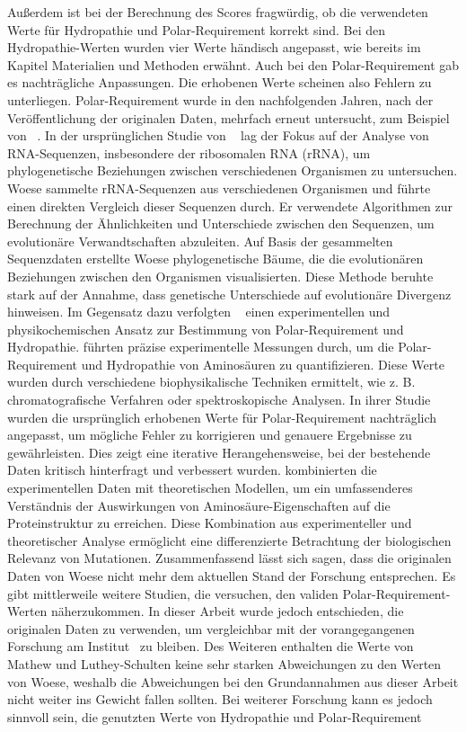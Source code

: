 \documentclass[german,version-2022-01]{uzl-thesis}
\begin{document}
Au\ss{}erdem ist bei der Berechnung des Scores fragw\"urdig, ob die verwendeten Werte f\"ur Hydropathie und Polar-Requirement korrekt sind. Bei den Hydropathie-Werten wurden vier Werte h\"andisch angepasst, wie bereits im Kapitel Materialien und Methoden erw\"ahnt. Auch bei den Polar-Requirement gab es nachtr\"agliche Anpassungen. Die erhobenen Werte scheinen also Fehlern zu unterliegen. Polar-Requirement wurde in den nachfolgenden Jahren, nach der Ver\"offentlichung der originalen Daten, mehrfach erneut untersucht, zum Beispiel von \citeauthor{mathew_physical_2008}~\cite{mathew_physical_2008}. In der urspr\"unglichen Studie von \citeauthor{woese_fundamental_1966}~\cite{woese_fundamental_1966} lag der Fokus auf der Analyse von RNA-Sequenzen, insbesondere der ribosomalen RNA (rRNA), um phylogenetische Beziehungen zwischen verschiedenen Organismen zu untersuchen. Woese sammelte rRNA-Sequenzen aus verschiedenen Organismen und f\"uhrte einen direkten Vergleich dieser Sequenzen durch. Er verwendete Algorithmen zur Berechnung der \"Ahnlichkeiten und Unterschiede zwischen den Sequenzen, um evolution\"are Verwandtschaften abzuleiten. Auf Basis der gesammelten Sequenzdaten erstellte Woese phylogenetische B\"aume, die die evolution\"aren Beziehungen zwischen den Organismen visualisierten. Diese Methode beruhte stark auf der Annahme, dass genetische Unterschiede auf evolution\"are Divergenz hinweisen. Im Gegensatz dazu verfolgten \citeauthor{mathew_physical_2008}~\cite{mathew_physical_2008} einen experimentellen und physikochemischen Ansatz zur Bestimmung von Polar-Requirement und Hydropathie. \citeauthor{mathew_physical_2008} f\"uhrten pr\"azise experimentelle Messungen durch, um die Polar-Requirement und Hydropathie von Aminos\"auren zu quantifizieren. Diese Werte wurden durch verschiedene biophysikalische Techniken ermittelt, wie z. B. chromatografische Verfahren oder spektroskopische Analysen. In ihrer Studie wurden die urspr\"unglich erhobenen Werte f\"ur Polar-Requirement nachtr\"aglich angepasst, um m\"ogliche Fehler zu korrigieren und genauere Ergebnisse zu gew\"ahrleisten. Dies zeigt eine iterative Herangehensweise, bei der bestehende Daten kritisch hinterfragt und verbessert wurden. \citeauthor{mathew_physical_2008} kombinierten die experimentellen Daten mit theoretischen Modellen, um ein umfassenderes Verst\"andnis der Auswirkungen von Aminos\"aure-Eigenschaften auf die Proteinstruktur zu erreichen. Diese Kombination aus experimenteller und theoretischer Analyse erm\"oglicht eine differenzierte Betrachtung der biologischen Relevanz von Mutationen. Zusammenfassend l\"asst sich sagen, dass die originalen Daten von Woese nicht mehr dem aktuellen Stand der Forschung entsprechen. Es gibt mittlerweile weitere Studien, die versuchen, den validen Polar-Requirement-Werten n\"aherzukommen. In dieser Arbeit wurde jedoch entschieden, die originalen Daten zu verwenden, um vergleichbar mit der vorangegangenen Forschung am Institut~\cite{nina} zu bleiben. Des Weiteren enthalten die Werte von Mathew und Luthey-Schulten keine sehr starken Abweichungen zu den Werten von Woese, weshalb die Abweichungen bei den Grundannahmen aus dieser Arbeit nicht weiter ins Gewicht fallen sollten. Bei weiterer Forschung kann es jedoch sinnvoll sein, die genutzten Werte von Hydropathie und Polar-Requirement 
\end{document}
